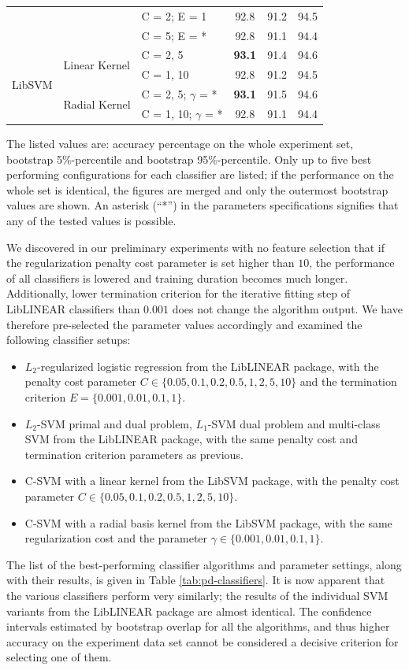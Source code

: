 \documentclass[12pt,notitlepage]{report}
\begin{document}
\begin{table}[htbp]
\begin{center}
\begin{tabular}{|l|l|l|c|c|c|}
 &  & C = 2; E = 1 & 92.8 & 91.2 & 94.5 \\
 &  & C = 5; E = * & 92.8 & 91.1 & 94.4 \\\hline
 \multirow{4}{*}{LibSVM} & \multirow{2}{*}{Linear Kernel} & C = 2, 5 & \bf 93.1 & 91.4 & 94.6 \\
 &  & C = 1, 10 & 92.8 & 91.2 & 94.5 \\\cline{2-6}
 & \multirow{2}{*}{Radial Kernel} & C = 2, 5; $\gamma$ = * & \bf 93.1 & 91.5 & 94.6 \\
 &  & C = 1, 10; $\gamma$ = * & 92.8 & 91.1 & 94.4 \\\hline
\end{tabular}
\shorthandon{-}
\end{center}
The listed values are: accuracy percentage on the whole experiment set, bootstrap 5\%-percentile and bootstrap 95\%-percentile. Only up to five best performing configurations for each classifier are listed; if the performance on the whole set is identical, the figures are merged and only the outermost bootstrap values are shown. An asterisk (``*'') in the parameters specifications signifies that any of the tested values is possible.
\end{table}

We discovered in our preliminary experiments with no feature selection that if the regularization penalty cost parameter is set higher than $10$, the performance of all classifiers is lowered and training duration becomes much longer. Additionally, lower termination criterion for the iterative fitting step of LibLINEAR classifiers than $0.001$ does not change the algorithm output. We have therefore pre-selected the parameter values accordingly and examined the following classifier setups:
\begin{itemize}
    \item $L_2$-regularized logistic regression from the LibLINEAR package, with the penalty cost parameter $C\in\{0.05,0.1,0.2,0.5,1,2,5,10\}$ and the termination criterion $E=\{0.001, 0.01, 0.1, 1\}$.
    \item $L_2$-SVM primal and dual problem, $L_1$-SVM dual problem and multi-class SVM from the LibLINEAR package, with the same penalty cost and termination criterion parameters as previous.
    \item C-SVM with a linear kernel from the LibSVM package, with the penalty cost parameter $C\in\{0.05,0.1,0.2,0.5,1,2,5,10\}$.
    \item C-SVM with a radial basis kernel from the LibSVM package, with the same regularization cost and the parameter $\gamma\in\{0.001,0.01,0.1,1\}$. 
\end{itemize}
The list of the best-performing classifier algorithms and parameter settings, along with their results, is given in Table \ref{tab:pd-classifiers}. It is now apparent that the various classifiers perform very similarly; the results of the individual SVM variants from the LibLINEAR package are almost identical. The confidence intervals estimated by bootstrap overlap for all the algorithms, and thus higher accuracy on the experiment data set cannot be considered a decisive criterion for selecting one of them. 
\end{document}
